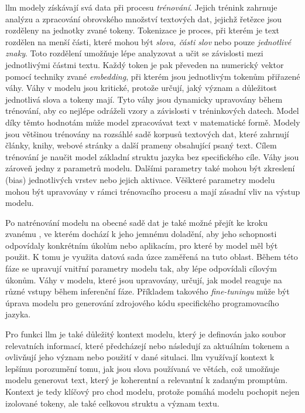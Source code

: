\documentclass[czech, ma, kiv, he, iso690numb, pdf, viewonly]{fasthesis}
\begin{document}
    \Gls{llm} modely získávají svá data při procesu \textit{trénování}. Jejich trénink zahrnuje analýzu a zpracování obrovského množství textových dat, jejichž řetězce jsou rozděleny na jednotky zvané \gls{token}y. Tokenizace je proces, při kterém je text rozdělen na menší části, které mohou být \textit{slova, části slov} nebo pouze \textit{jednotlivé znaky}. Toto rozdělení umožňuje lépe analyzovat a učit se závislosti mezi jednotlivými částmi textu. Každý token je pak převeden na numerický vektor pomocí techniky zvané \emph{embedding}, při kterém jsou jednotlivým tokenům přiřazené váhy. Váhy v modelu jsou kritické, protože určují, jaký význam a důležitost jednotlivá slova a tokeny mají. Tyto váhy jsou dynamicky upravovány během trénování, aby co nejlépe odráželi vzory a závislosti v tréninkových datech. Model díky těmto hodnotám může model zpracovávat text v matematické formě. Modely jsou většinou trénovány na rozsáhlé sadě korpusů textových dat, které zahrnují články, knihy, webové stránky a další prameny obsahující psaný text. Cílem trénování je naučit model základní struktu jazyka bez specifického cíle. Váhy jsou zároveň jedny z parametrů modelu. Dalšími parametry také mohou být zkreslení (bias) jednotlivých vrstev nebo jejich aktivace. Věškteré parametry modelu mohou být upravovány v rámci trénovacího procesu a mají zásadní vliv na výstup modelu. \cite{prazak2022embedding} \cite{prazak2022seq2seq}

    \pagebreak
    Po natrénování modelu na obecné sadě dat je také možné přejít ke kroku zvanému , ve kterém dochází k jeho jemnému doladění, aby jeho schopnosti odpovídaly konkrétním úkolům nebo aplikacím, pro které by model měl být použit. K tomu je využita datová sada úzce zaměřená na tuto oblast. Během této fáze se upravují vnitřní parametry modelu tak, aby lépe odpovídali cílovým úkonům. Váhy v modelu, které jsou upravovány, určují, jak model reaguje na různé vstupy během inferenční fáze. Příkladem takového \textit{fine-tuningu} může být úprava modelu pro generování zdrojového kódu specifického programovacího jazyka.

    Pro funkci \Gls{llm} je také důležitý kontext modelu, který je definován jako soubor relevatních informací, které předcházejí nebo následují za aktuálním tokenem a ovlivňují jeho význam nebo použití v dané situlaci. \Gls{llm} využívají kontext k lepšímu porozumění tomu, jak jsou slova používaná ve větách, což umožňuje modelu generovat text, který je koherentní a relevantní k zadaným promptům. Kontext je tedy klíčový pro chod modelu, protože pomáhá modelu pochopit nejen izolované tokeny, ale také celkovou struktu a význam textu.
\end{document}
